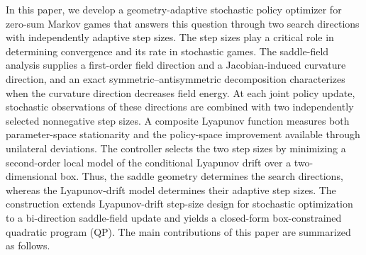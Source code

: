 \documentclass[journal]{IEEEtran}
\theoremstyle{remark}
\begin{document}
	In this paper, we develop a geometry-adaptive stochastic policy optimizer for zero-sum Markov games that answers this question through two search directions with independently adaptive step sizes.
	The step sizes play a critical role in determining convergence and its rate in stochastic games.
	The saddle-field analysis supplies a first-order field direction and a Jacobian-induced curvature direction, and an exact symmetric--antisymmetric decomposition characterizes when the curvature direction decreases field energy.
	At each joint policy update, stochastic observations of these directions are combined with two independently selected nonnegative step sizes.
	A composite Lyapunov function measures both parameter-space stationarity and the policy-space improvement available through unilateral deviations.
	The controller selects the two step sizes by minimizing a second-order local model of the conditional Lyapunov drift over a two-dimensional box.
	Thus, the saddle geometry determines the search directions, whereas the Lyapunov-drift model determines their adaptive step sizes.
	The construction extends Lyapunov-drift step-size design for stochastic optimization \cite{Zhang2025AdaptivePolyak,Yuan2025StepSizeSDE} to a bi-direction saddle-field update and yields a closed-form box-constrained quadratic program (QP).
	The main contributions of this paper are summarized as follows.
\end{document}
